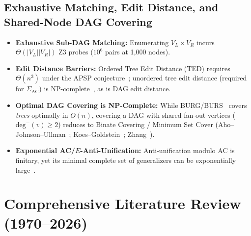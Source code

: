 \documentclass[11pt,a4paper]{article}
\begin{document}
\subsection{Exhaustive Matching, Edit Distance, and Shared-Node DAG Covering}
\begin{itemize}
  \item \textbf{Exhaustive Sub-DAG Matching:} Enumerating $V_L \times V_R$ incurs $\Theta(|V_L||V_R|)$ Z3 probes ($10^6$ pairs at 1,000 nodes).
  \item \textbf{Edit Distance Barriers:} Ordered Tree Edit Distance (TED) requires $\Theta(n^3)$ under the APSP conjecture~\cite{bringmann2020}; unordered tree edit distance (required for $\Sigma_{\text{AC}}$) is NP-complete~\cite{zhang1992}, as is DAG edit distance.
  \item \textbf{Optimal DAG Covering is NP-Complete:} While BURG/BURS~\cite{fraser1992,proebsting1995} covers \emph{trees} optimally in $O(n)$, covering a DAG with shared fan-out vertices ($\mathrm{deg}^-(v) \ge 2$) reduces to Binate Covering / Minimum Set Cover (Aho--Johnson--Ullman~\cite{aho1977}; Koes--Goldstein~\cite{koes2008}; Zhang~\cite{zhang2023extract}).
  \item \textbf{Exponential AC/$E$-Anti-Unification:} Anti-unification modulo AC is finitary, yet its minimal complete set of generalizers can be exponentially large~\cite{alpuente2014,cerna2023}.
\end{itemize}

\section{Comprehensive Literature Review (1970--2026)}
\label{sec:lit}
\end{document}
